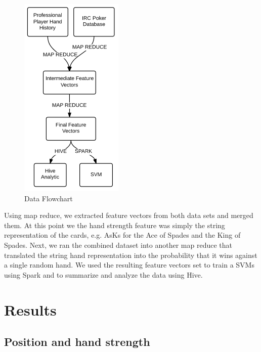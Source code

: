 \documentclass[twoside]{article}
\begin{document}
\begin{multicols}{2}
\begin{figure}[H]
  \centering
  \centerline{\includegraphics[width=0.5\columnwidth]{Flowchart.png}}
   \caption{Data Flowchart}
  \label{fig:Data flow}
\end{figure}

Using map reduce, we extracted feature vectors from both data sets and merged them. At this point we the hand strength feature was simply the string representation of the cards, e.g. AsKs for the Ace of Spades and the King of Spades. Next, we ran the combined dataset into another map reduce that translated the string hand representation into the probability that it wins against a single random hand. We used the resulting feature vectors set to train a SVMs using Spark and to summarize and analyze the data using Hive. 


\section{Results}

\subsection{Position and hand strength}


\end{multicols}
\end{document}
